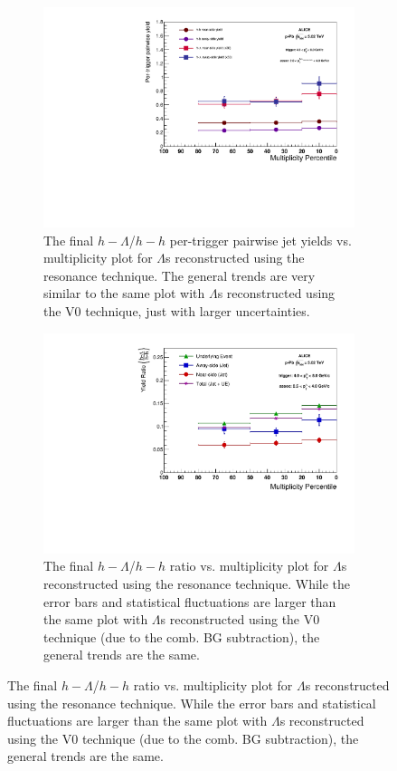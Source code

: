 \documentclass[ALICE,manyauthors]{ALICE_analysis_notes}
\begin{document}
\begin{figure}[ht]
\begin{figure}[ht]
\centering
\includegraphics[width=4in]{figures/pairwise_plot_resonance.pdf}
\caption{The final $h-\Lambda$/$h-h$ per-trigger pairwise jet yields vs. multiplicity plot for $\Lambda$s reconstructed using the resonance technique. The general trends are very similar to the same plot with $\Lambda$s reconstructed using the V0 technique, just with larger uncertainties.}
\label{final_pairwise_yields_resonance}
\end{figure}

\begin{figure}[ht]
\centering
\includegraphics[width=4in]{figures/ratio_plot_resonance.pdf}
\caption{The final $h-\Lambda$/$h-h$ ratio vs. multiplicity plot for $\Lambda$s reconstructed using the resonance technique. While the error bars and statistical fluctuations are larger than the same plot with $\Lambda$s reconstructed using the V0 technique (due to the comb. BG subtraction), the general trends are the same.}
\label{final_ratio_resonance}
\end{figure}




\end{figure}
\end{document}
